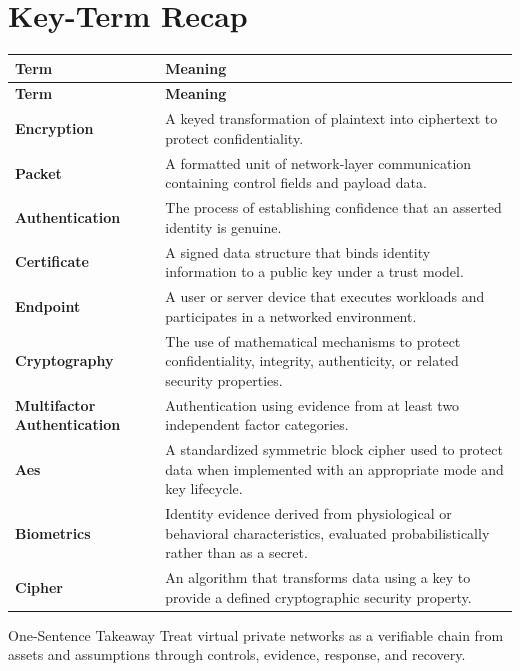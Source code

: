 \documentclass[11pt,letterpaper]{article}
\begin{document}
\section*{Key-Term Recap}
\begin{longtable}{>{\raggedright\arraybackslash}p{}>{\raggedright\arraybackslash}p{}}
\toprule\rowcolor{Navy}\color{white}\textbf{Term} & \color{white}\textbf{Meaning}\\\midrule
\endfirsthead
\toprule\rowcolor{Navy}\color{white}\textbf{Term} & \color{white}\textbf{Meaning}\\\midrule
\endhead
\textbf{Encryption} & A keyed transformation of plaintext into ciphertext to protect confidentiality. \\\midrule
\textbf{Packet} & A formatted unit of network-layer communication containing control fields and payload data. \\\midrule
\textbf{Authentication} & The process of establishing confidence that an asserted identity is genuine. \\\midrule
\textbf{Certificate} & A signed data structure that binds identity information to a public key under a trust model. \\\midrule
\textbf{Endpoint} & A user or server device that executes workloads and participates in a networked environment. \\\midrule
\textbf{Cryptography} & The use of mathematical mechanisms to protect confidentiality, integrity, authenticity, or related security properties. \\\midrule
\textbf{Multifactor Authentication} & Authentication using evidence from at least two independent factor categories. \\\midrule
\textbf{Aes} & A standardized symmetric block cipher used to protect data when implemented with an appropriate mode and key lifecycle. \\\midrule
\textbf{Biometrics} & Identity evidence derived from physiological or behavioral characteristics, evaluated probabilistically rather than as a secret. \\\midrule
\textbf{Cipher} & An algorithm that transforms data using a key to provide a defined cryptographic security property. \\\midrule
\bottomrule
\end{longtable}
\begin{CornellExamBox}{One-Sentence Takeaway}
Treat virtual private networks as a verifiable chain from assets and assumptions through controls, evidence, response, and recovery.
\end{CornellExamBox}
\end{document}
